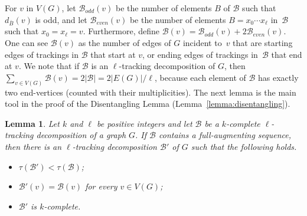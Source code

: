 \documentclass[12pt,reqno,a4paper]{amsart}
\newtheorem{lemma}[theorem]{Lemma}
\newcommand{\B}{\mathcal{B}}
\newcommand{\full}{full}
\begin{document}

For $v$ in $V(G)$, let \(\B_{odd}(v)\) be the number of elements \(B\) of 
\(\B\) such that \(d_{\bar B}(v)\) is odd, and let \(\B_{even}(v)\) be the number of 
elements \(B=x_0\cdots x_{\ell}\) in~\(\mathcal{B}\) 
such that $x_0=x_\ell=v$. Furthermore, define \(\B(v) = \B_{odd}(v) + 2\B_{even}(v)\). 
One can see $\B(v)$ as the number of edges of \(G\) incident to~\(v\) that are 
starting edges of trackings in \(\mathcal{B}\) 
that start at \(v\), or ending edges of trackings in~$\mathcal{B}$ that end at $v$.
We note that if \(\B\) is an \(\ell\)-tracking decomposition of \(G\), 
then \(\sum_{v\in V(G)}\B(v) = 2|\B| = 
2|E(G)|/\ell\),
because each element of \(\B\) has exactly two end-vertices (counted with 
their multiplicities). The next lemma 
is the main tool in the proof of the Disentangling Lemma 
(Lemma~\ref{lemma:disentangling}).




\begin{lemma}\label{lemma:augmenting-sequence}
	Let \(k\) and \(\ell\) be positive integers
	and let \(\B\) be a \(k\)-complete \(\ell\)-tracking decomposition of a graph \(G\).
	If \(\B\) contains a \full-augmenting sequence, 
	then there is an \(\ell\)-tracking decomposition \(\B'\) of \(G\) 
	such that the following holds.
	\begin{itemize}
	 \item \(\tau(\B') < \tau(\B)\);
	 \item \(\B'(v) = \B(v)\) for every $v\in V(G)$;
	 \item $\B'$ is \(k\)-complete.
	\end{itemize}
\end{lemma}
\end{document}
